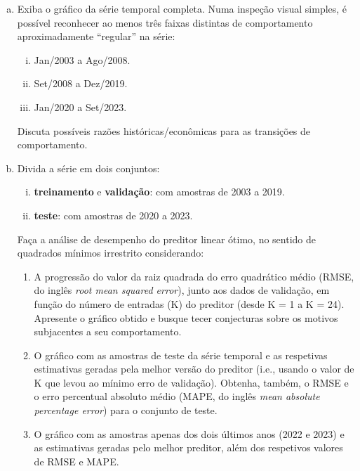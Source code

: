 \documentclass[final,5p]{elsarticle}
\numberwithin{equation}{section}
\begin{document}
    \begin{enumerate}[(a)]
        \item Exiba o gráfico da série temporal completa. Numa inspeção visual simples, é possível reconhecer ao menos três faixas distintas de comportamento aproximadamente “regular” na série:

        \begin{enumerate}[(i)]
            \item Jan/2003 a Ago/2008.
            \item Set/2008 a Dez/2019.
            \item Jan/2020 a Set/2023.
        \end{enumerate}

        Discuta possíveis razões históricas/econômicas para as transições de comportamento.

        \item Divida a série em dois conjuntos:

        \begin{enumerate}[(i)]
            \item \textbf{treinamento} e \textbf{validação}: com amostras de 2003 a 2019.
            \item \textbf{teste}: com amostras de 2020 a 2023.
        \end{enumerate}

        Faça a análise de desempenho do preditor linear ótimo, no sentido de quadrados mínimos irrestrito considerando:

        \begin{enumerate}[(1)]
            \item A progressão do valor da raiz quadrada do erro quadrático médio (RMSE, do inglês \emph{root mean squared error}), junto aos dados de validação, em função do número de entradas (K) do preditor (desde K = 1 a K = 24). Apresente o gráfico obtido e busque tecer conjecturas sobre os motivos subjacentes a seu comportamento. \label{item:b1}
            \item O gráfico com as amostras de teste da série temporal e as respetivas estimativas geradas pela melhor versão do preditor (i.e., usando o valor de K que levou ao mínimo erro de validação). Obtenha, também, o RMSE e o erro percentual absoluto médio (MAPE, do inglês \emph{mean absolute percentage error}) para o conjunto de teste.  \label{item:b2}
            \item O gráfico com as amostras apenas dos dois últimos anos (2022 e 2023) e as estimativas geradas pelo melhor preditor, além dos respetivos valores de RMSE e MAPE.  \label{item:b3}
        \end{enumerate}


\end{enumerate}
\end{document}
